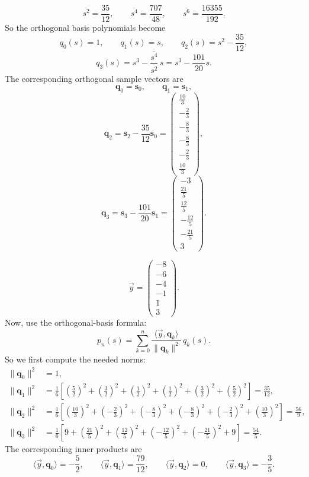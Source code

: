 \documentclass[10pt]{extarticle}
\begin{document}
\begin{enumerate}[label=(\alph*)]
\[
\overline{s^2}=\frac{35}{12},
\qquad
\overline{s^4}=\frac{707}{48},
\qquad
\overline{s^6}=\frac{16355}{192}.
\]
So the orthogonal basis polynomials become
\[
q_0(s)=1,
\qquad
q_1(s)=s,
\qquad
q_2(s)=s^2-\frac{35}{12},
\]
\[
q_3(s)=s^3-\frac{\overline{s^4}}{\overline{s^2}}\,s
=s^3-\frac{101}{20}s.
\]
The corresponding orthogonal sample vectors are
\[
\mathbf{q}_0=\mathbf{s}_0,
\qquad
\mathbf{q}_1=\mathbf{s}_1,
\]
\[
\mathbf{q}_2=\mathbf{s}_2-\frac{35}{12}\mathbf{s}_0
=
\begin{pmatrix}
\frac{10}{3}\\[0.3em]
-\frac{2}{3}\\[0.3em]
-\frac{8}{3}\\[0.3em]
-\frac{8}{3}\\[0.3em]
-\frac{2}{3}\\[0.3em]
\frac{10}{3}
\end{pmatrix},
\]
\[
\mathbf{q}_3=\mathbf{s}_3-\frac{101}{20}\mathbf{s}_1
=
\begin{pmatrix}
-3\\[0.3em]
\frac{21}{5}\\[0.3em]
\frac{12}{5}\\[0.3em]
-\frac{12}{5}\\[0.3em]
-\frac{21}{5}\\[0.3em]
3
\end{pmatrix}.
\]

\[
\vec{y}=
\begin{pmatrix}
-8\\-6\\-4\\-1\\1\\3
\end{pmatrix}.
\]
Now, use the orthogonal-basis formula:
\[
p_n(s)=\sum_{k=0}^n \frac{\langle \vec{y},\mathbf{q}_k\rangle}{\|\mathbf{q}_k\|^2}\,q_k(s).
\]
So we first compute the needed norms:
\[
\begin{aligned}
\| \mathbf{q}_0\|^2&=1,\\[0.4em]
\| \mathbf{q}_1\|^2&=\frac{1}{6}\left[\left(\frac{5}{2}\right)^2+\left(\frac{3}{2}\right)^2+\left(\frac{1}{2}\right)^2+\left(\frac{1}{2}\right)^2+\left(\frac{3}{2}\right)^2+\left(\frac{5}{2}\right)^2\right]=\frac{35}{12},\\[0.4em]
\| \mathbf{q}_2\|^2&=\frac{1}{6}\left[\left(\frac{10}{3}\right)^2+\left(-\frac{2}{3}\right)^2+\left(-\frac{8}{3}\right)^2+\left(-\frac{8}{3}\right)^2+\left(-\frac{2}{3}\right)^2+\left(\frac{10}{3}\right)^2\right]=\frac{56}{9},\\[0.4em]
\| \mathbf{q}_3\|^2&=\frac{1}{6}\left[9+\left(\frac{21}{5}\right)^2+\left(\frac{12}{5}\right)^2+\left(-\frac{12}{5}\right)^2+\left(-\frac{21}{5}\right)^2+9\right]=\frac{54}{5}.
\end{aligned}
\]
The corresponding inner products are
\[
\langle \vec{y},\mathbf{q}_0\rangle=-\frac{5}{2},
\qquad
\langle \vec{y},\mathbf{q}_1\rangle=\frac{79}{12},
\qquad
\langle \vec{y},\mathbf{q}_2\rangle=0,
\qquad
\langle \vec{y},\mathbf{q}_3\rangle=-\frac{3}{5}.
\]


\end{enumerate}
\end{document}
